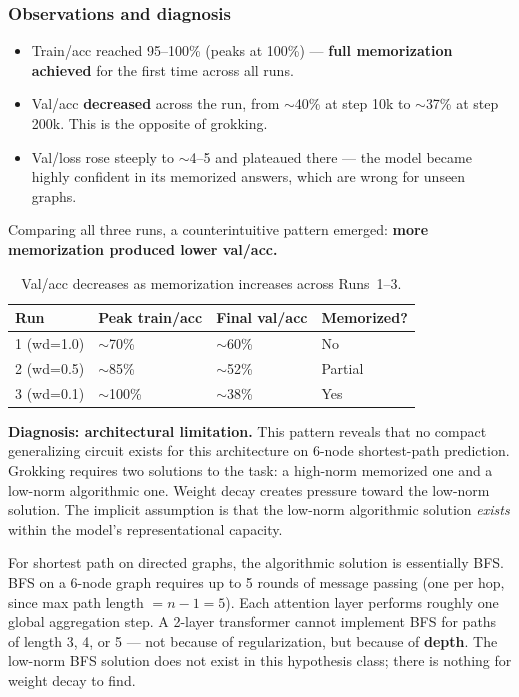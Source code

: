 \documentclass[11pt, a4paper]{article}
\begin{document}
\subsubsection{Observations and diagnosis}

\begin{itemize}[noitemsep]
  \item Train/acc reached 95--100\% (peaks at 100\%) --- \textbf{full
        memorization achieved} for the first time across all runs.
  \item Val/acc \textbf{decreased} across the run, from $\sim$40\% at step
        10k to $\sim$37\% at step 200k. This is the opposite of grokking.
  \item Val/loss rose steeply to $\sim$4--5 and plateaued there --- the model
        became highly confident in its memorized answers, which are wrong
        for unseen graphs.
\end{itemize}

Comparing all three runs, a counterintuitive pattern emerged:
\textbf{more memorization produced lower val/acc.}

\begin{table}[H]
\centering
\begin{tabular}{@{}llll@{}}
\toprule
Run & Peak train/acc & Final val/acc & Memorized? \\
\midrule
1 (wd=1.0) & $\sim$70\%  & $\sim$60\% & No  \\
2 (wd=0.5) & $\sim$85\%  & $\sim$52\% & Partial \\
3 (wd=0.1) & $\sim$100\% & $\sim$38\% & Yes \\
\bottomrule
\end{tabular}
\caption{Val/acc decreases as memorization increases across Runs~1--3.}
\end{table}

\textbf{Diagnosis: architectural limitation.}
This pattern reveals that no compact generalizing circuit exists for this
architecture on 6-node shortest-path prediction. Grokking requires two
solutions to the task: a high-norm memorized one and a low-norm algorithmic
one. Weight decay creates pressure toward the low-norm solution. The implicit
assumption is that the low-norm algorithmic solution \emph{exists} within the
model's representational capacity.

For shortest path on directed graphs, the algorithmic solution is essentially
BFS. BFS on a 6-node graph requires up to 5 rounds of message passing (one
per hop, since max path length $= n - 1 = 5$). Each attention layer performs
roughly one global aggregation step. A 2-layer transformer cannot implement
BFS for paths of length 3, 4, or 5 --- not because of regularization, but
because of \textbf{depth}. The low-norm BFS solution does not exist in this
hypothesis class; there is nothing for weight decay to find.
\end{document}
